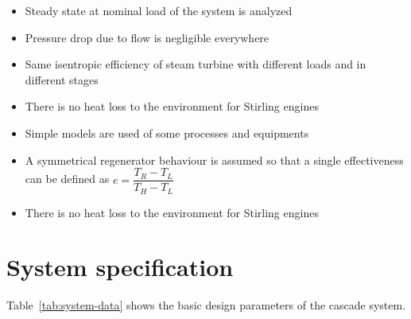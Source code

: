 \documentclass{article}
\begin{document}
\begin{itemize}
	\item Steady state at nominal load of the system is analyzed
	\item Pressure drop due to flow is negligible everywhere
	\item Same isentropic efficiency of steam turbine with different loads and in different stages
	\item There is no heat loss to the environment for Stirling engines
	\item Simple models are used of some processes and equipments
	\item A symmetrical regenerator behaviour is assumed so that a single effectiveness can be defined as $e=\dfrac{T_R - T_L}{T_H - T_L}$\cite{Formosa2010, Albert2010}
	\item There is no heat loss to the environment for Stirling engines
\end{itemize}

\section{System specification}
Table~\ref{tab:system-data} shows the basic design parameters of the cascade system.
\end{document}
